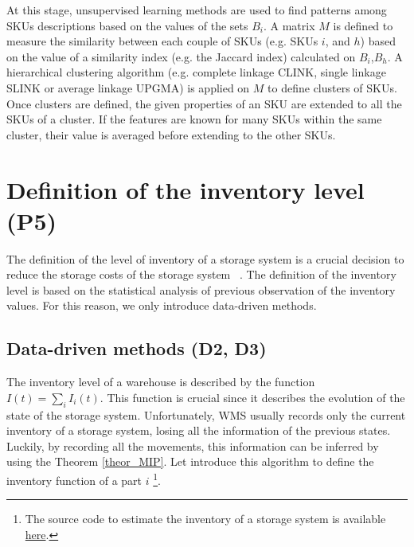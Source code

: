 At this stage, unsupervised learning methods are used to find patterns among SKUs descriptions based on the values of the sets $B_i$. A matrix $M$ is defined to measure the similarity between each couple of SKUs (e.g. SKUs $i$, and $h$) based on the value of a similarity index (e.g. the Jaccard index) calculated on $B_i$,$B_h$. A hierarchical clustering algorithm (e.g. complete linkage CLINK, single linkage SLINK or average linkage UPGMA) is applied on $M$ to define clusters of SKUs. Once clusters are defined, the given properties of an SKU are extended to all the SKUs of a cluster. If the features are known for many SKUs within the same cluster, their value is averaged before extending to the other SKUs.

\section{Definition of the inventory level (P5)} \label{secInventoryDesign}
The definition of the level of inventory of a storage system is a crucial decision to reduce the storage costs of the storage system ~\cite{Cormier1999,Cormier1992,Goh2001, Hung1984, Levy1974, Lowe1979, Rao1998, Rosenblatt1984, Rosenblatt1988, White1971}. The definition of the inventory level is based on the statistical analysis of previous observation of the inventory values. For this reason, we only introduce data-driven methods.

\subsection{Data-driven methods (D2, D3)}
The inventory level of a warehouse is described by the function $I\left(t\right)=\sum_{i}{I_i(t)}$. This function is crucial since it describes the evolution of the state of the storage system. Unfortunately, WMS usually records only the current inventory of a storage system, losing all the information of the previous states. Luckily, by recording all the movements, this information can be inferred by using the Theorem \ref{theor_MIP}. Let introduce this algorithm to define the inventory function of a part $i$ \footnote{The source code to estimate the inventory of a storage system is available \href{https://github.com/aletuf93/logproj/blob/master/logproj/information_framework.py}{here}.}.\par

